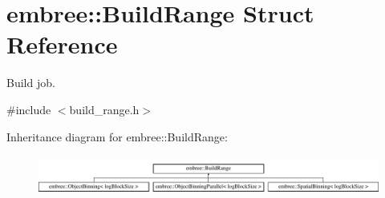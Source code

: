 \hypertarget{structembree_1_1_build_range}{
\section{embree::BuildRange Struct Reference}
\label{structembree_1_1_build_range}
}


Build job.  




{\ttfamily \#include $<$build\_\-range.h$>$}

Inheritance diagram for embree::BuildRange:\begin{figure}[H]
\begin{center}
\leavevmode
\includegraphics[height=1.305361cm]{structembree_1_1_build_range}
\end{center}
\end{figure}
